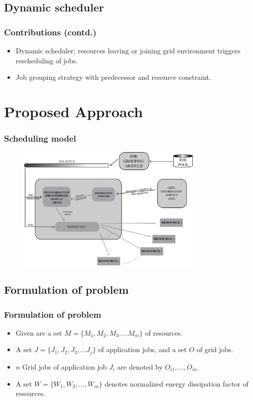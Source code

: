\documentclass{beamer}
\begin{document}
\subsection*{Dynamic scheduler}
\begin{frame}
 \frametitle{Contributions (contd.)}
 \begin{itemize}
	\item Dynamic scheduler; resources leaving or joining grid environment triggers rescheduling of jobs.
	\item Job grouping strategy with predecessor and resource constraint.
\end{itemize}
\end{frame}


\section[Approach]{Proposed Approach}
\begin{frame}
 \frametitle{Scheduling model}
\begin{figure}[t]
\centering
\includegraphics[width=0.80\textwidth]{imgs/scheduler}
\end{figure}
\end{frame}

\subsection*{Formulation of problem}
\begin{frame}
\frametitle{Formulation of problem}
  \begin{itemize}
  \item Given are a set $M = \{M_1, M_2, M_3, ... M_m\}$ of resources.
  \item A set $J = \{J_1, J_2, J_3, ... J_j\}$ of application jobs, and a set $O$ of grid jobs.
  \item $n$ Grid jobs of application job $J_i$ are denoted by $O_{i1},..., O_{in}$.
  \item A set $W= \{W_1,W_2,\ldots,W_m\}$ denotes normalized energy dissipation factor of resources.
  \end{itemize}
\end{frame}
\end{document}
